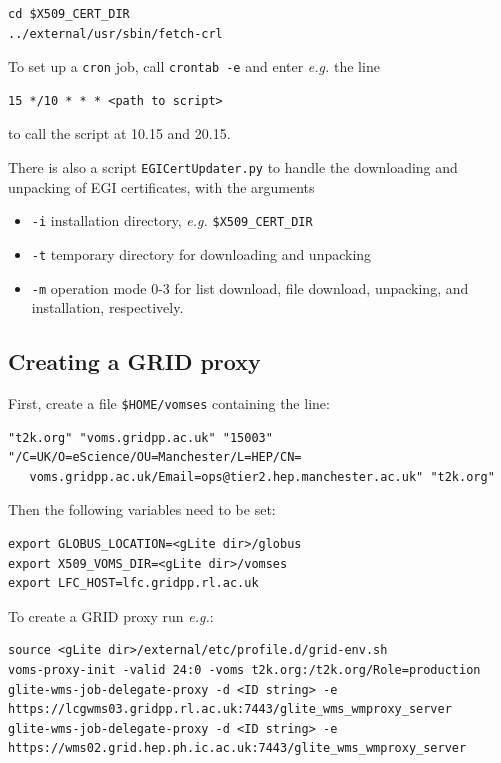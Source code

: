 \documentclass[11pt]{article}
\begin{document}
\begin{verbatim}
cd $X509_CERT_DIR
../external/usr/sbin/fetch-crl
\end{verbatim}
To set up a \verb+cron+ job, call \verb+crontab -e+ and enter
\textit{e.g.} the line

\begin{verbatim}
15 */10 * * * <path to script>
\end{verbatim}
to call the script at 10.15 and 20.15.

There is also a script \verb+EGICertUpdater.py+ to handle the
downloading and unpacking of EGI certificates, with the arguments

\begin{itemize}
\item \verb+-i+ installation directory, \textit{e.g.} \verb+$X509_CERT_DIR+
\item \verb+-t+ temporary directory for downloading and unpacking
\item \verb+-m+ operation mode 0-3 for list download, file download, unpacking, and installation, respectively. 
\end{itemize}

\subsection{Creating a GRID proxy}
First, create a file \verb+$HOME/vomses+ containing the line:
\begin{verbatim}
"t2k.org" "voms.gridpp.ac.uk" "15003" "/C=UK/O=eScience/OU=Manchester/L=HEP/CN=
   voms.gridpp.ac.uk/Email=ops@tier2.hep.manchester.ac.uk" "t2k.org"
\end{verbatim}

Then the following variables need to be set:
\begin{verbatim}
export GLOBUS_LOCATION=<gLite dir>/globus
export X509_VOMS_DIR=<gLite dir>/vomses
export LFC_HOST=lfc.gridpp.rl.ac.uk
\end{verbatim}

To create a GRID proxy run \textit{e.g.}:
\begin{verbatim}
source <gLite dir>/external/etc/profile.d/grid-env.sh
voms-proxy-init -valid 24:0 -voms t2k.org:/t2k.org/Role=production
glite-wms-job-delegate-proxy -d <ID string> -e 
https://lcgwms03.gridpp.rl.ac.uk:7443/glite_wms_wmproxy_server
glite-wms-job-delegate-proxy -d <ID string> -e 
https://wms02.grid.hep.ph.ic.ac.uk:7443/glite_wms_wmproxy_server
\end{verbatim}
\end{document}
